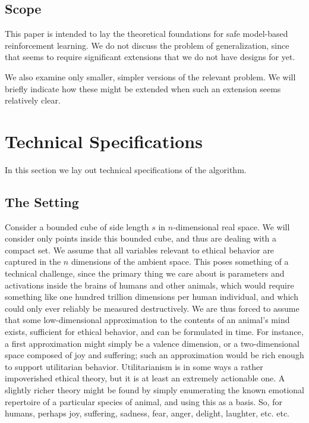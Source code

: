 \documentclass[11pt]{article}
\begin{document}
\subsection{Scope}
This paper is intended to lay the theoretical foundations for safe
model-based reinforcement learning. We do not discuss the problem of
generalization, since that seems to require significant extensions
that we do not have designs for yet.

We also examine only smaller, simpler versions of the relevant
problem. We will briefly indicate how these might be extended when
such an extension seems relatively clear.

\section{Technical Specifications}

In this section we lay out technical specifications of the algorithm.

\subsection{The Setting}

Consider a bounded cube of side length $s$ in $n$-dimensional real
space. We will consider only points inside this bounded cube, and thus
are dealing with a compact set. We assume that all variables relevant
to ethical behavior are captured in the $n$ dimensions of the ambient
space. This poses something of a technical challenge, since the
primary thing we care about is parameters and activations inside the
brains of humans and other animals, which would require something like
one hundred trillion dimensions per human individual, and which could
only ever reliably be measured destructively. We are thus forced to
assume that some low-dimensional approximation to the contents of an
animal's mind exists, sufficient for ethical behavior, and can be
formulated in time. For instance, a first approximation might simply
be a valence dimension, or a two-dimensional space composed of joy and
suffering; such an approximation would be rich enough to support
utilitarian behavior. Utilitarianism is in some ways a rather
impoverished ethical theory, but it is at least an extremely
actionable one. A slightly richer theory might be found by simply
enumerating the known emotional repertoire of a particular species of
animal, and using this as a basis. So, for humans, perhaps joy,
suffering, sadness, fear, anger, delight, laughter, etc. etc.
\end{document}

